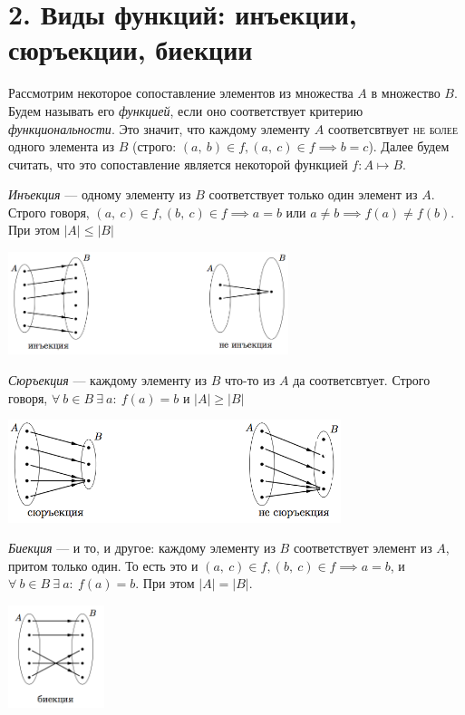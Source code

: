 \documentclass[a4paper, 12pt]{article}
\begin{document}
\section*{2. Виды функций: инъекции, сюръекции, биекции}
Рассмотрим некоторое сопоставление элементов из множества $A$ в множество $B$. Будем называть его \textit{функцией}, если оно соответствует критерию \textit{функциональности}. Это значит, что каждому элементу $A$ соответсвтвует \textsc{не более} одного элемента из $B$ (строго: $(a,\ b) \in f, (a,\ c) \in f \implies b = c$). Далее будем считать, что это сопоставление является некоторой функцией $f: A \mapsto B$.

\textit{Инъекция} --- одному элементу из $B$ соответствует только один элемент из $A$. Строго говоря, $(a,\ c) \in f, (b,\ c)\in f \implies a = b$ или $a \neq b \implies f(a) \neq f(b)$. При этом $|A| \leq |B|$

\begin{center}
\includegraphics[height=3cm]{images/in.png}
\end{center}

\textit{Сюръекция} --- каждому элементу из $B$ что-то из $A$ да соответсвтует. Строго говоря, $\forall\ b \in B\ \exists\ a:\ f(a) = b$ и $|A| \geq |B|$

\begin{center}
\includegraphics[height=3cm]{images/sur.png}
\end{center}

\textit{Биекция} --- и то, и другое: каждому элементу из $B$ соответствует элемент из $A$, притом только один. То есть это и $(a,\ c) \in f, (b,\ c)\in f \implies a = b$, и $\forall\ b \in B\ \exists\ a:\ f(a) = b$. При этом $|A| = |B|$.

\begin{center}
\includegraphics[height=3cm]{images/bi.png}
\end{center}
\end{document}
